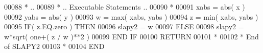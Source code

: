 \begin{DoxyCode}
00088 \textcolor{comment}{*     ..}
00089 \textcolor{comment}{*     .. Executable Statements ..}
00090 \textcolor{comment}{*}
00091       xabs = abs( x )
00092       yabs = abs( y )
00093       w = max( xabs, yabs )
00094       z = min( xabs, yabs )
00095       \textcolor{keywordflow}{IF}( z.EQ.zero ) \textcolor{keywordflow}{THEN}
00096          slapy2 = w
00097       \textcolor{keywordflow}{ELSE}
00098          slapy2 = w*sqrt( one+( z / w )**2 )
00099 \textcolor{keywordflow}{      END IF}
00100       \textcolor{keywordflow}{RETURN}
00101 \textcolor{comment}{*}
00102 \textcolor{comment}{*     End of SLAPY2}
00103 \textcolor{comment}{*}
00104 \textcolor{keyword}{      END}
\end{DoxyCode}
